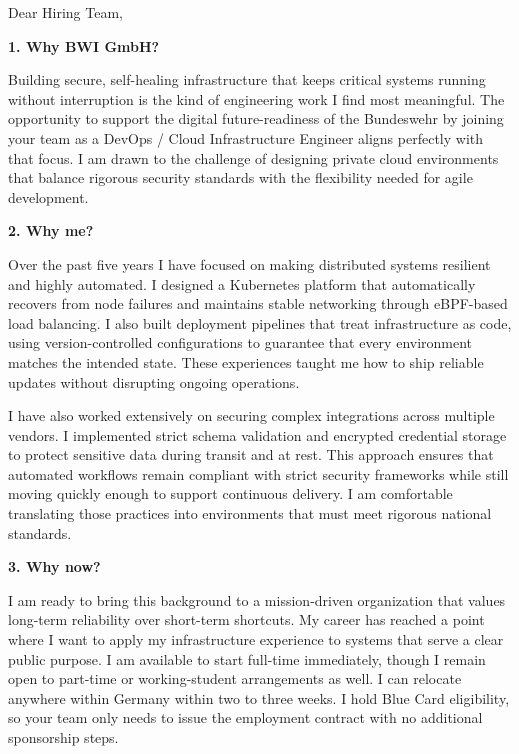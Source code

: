 \documentclass[11pt,a4paper]{coverletter}
\begin{document}

\opening{Dear Hiring Team,}

\vspace{8pt}\noindent\textbf{1. Why BWI GmbH?}\par\vspace{3pt}

Building secure, self-healing infrastructure that keeps critical systems running without interruption is the kind of engineering work I find most meaningful. The opportunity to support the digital future-readiness of the Bundeswehr by joining your team as a DevOps / Cloud Infrastructure Engineer aligns perfectly with that focus. I am drawn to the challenge of designing private cloud environments that balance rigorous security standards with the flexibility needed for agile development.

\vspace{8pt}\noindent\textbf{2. Why me?}\par\vspace{3pt}

Over the past five years I have focused on making distributed systems resilient and highly automated. I designed a Kubernetes platform that automatically recovers from node failures and maintains stable networking through eBPF-based load balancing. I also built deployment pipelines that treat infrastructure as code, using version-controlled configurations to guarantee that every environment matches the intended state. These experiences taught me how to ship reliable updates without disrupting ongoing operations.

I have also worked extensively on securing complex integrations across multiple vendors. I implemented strict schema validation and encrypted credential storage to protect sensitive data during transit and at rest. This approach ensures that automated workflows remain compliant with strict security frameworks while still moving quickly enough to support continuous delivery. I am comfortable translating those practices into environments that must meet rigorous national standards.

\vspace{8pt}\noindent\textbf{3. Why now?}\par\vspace{3pt}

I am ready to bring this background to a mission-driven organization that values long-term reliability over short-term shortcuts. My career has reached a point where I want to apply my infrastructure experience to systems that serve a clear public purpose. I am available to start full-time immediately, though I remain open to part-time or working-student arrangements as well. I can relocate anywhere within Germany within two to three weeks. I hold Blue Card eligibility, so your team only needs to issue the employment contract with no additional sponsorship steps.
\end{document}
